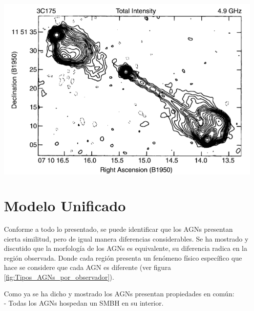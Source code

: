 \begin{center}
\includegraphics[scale=.3]{./figures/3_AGNs/Lobulos_y_Jets.png}
\label{fig:Lobulos}
\end{center}

\section{Modelo Unificado}
\label{sec:Unified_models}

Conforme a todo lo presentado, se puede identificar que los AGNs presentan cierta similitud, pero de igual manera diferencias considerables. Se ha mostrado y discutido que la morfología de los AGNs es equivalente, su diferencia radica en la región observada. Donde cada región presenta un fenómeno físico específico que hace se considere que cada AGN es diferente
(ver figura \ref{fig:Tipos_AGNs_por_observador}).

Como ya se ha dicho y mostrado los AGNs presentan propiedades en común: \\

- Todas los AGNs hospedan un SMBH en su interior. 

